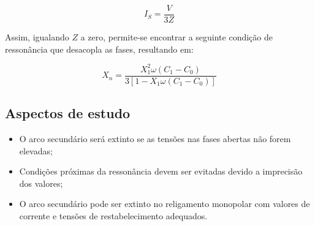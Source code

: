  \begin{equation} \label{slide2:is}
    I_S = \frac{V}{3Z}
\end{equation}

Assim, igualando $Z$ a zero, permite-se encontrar a seguinte condição de ressonância que desacopla as fases, resultando em:

 \begin{equation} \label{slide2:xn}
    X_n = \frac{X_1^2\omega (C_1-C_0)}{3[1-X_1\omega (C_1-C_0)]}
\end{equation}

\subsection{Aspectos de estudo}

\begin{itemize}
    \item O arco secundário será extinto se as tensões nas fases abertas não forem elevadas;
    \item Condições próximas da ressonância devem ser evitadas devido a imprecisão dos valores;
    \item O arco secundário pode ser extinto no religamento monopolar  com valores de corrente e tensões de restabelecimento adequados.      
\end{itemize}
